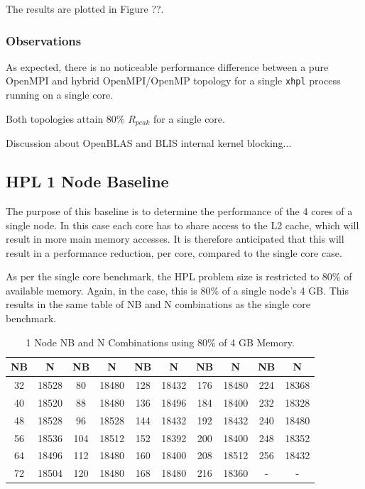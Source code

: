\documentclass{report}
\begin{document}
The results are plotted in Figure ??.


%
%
\subsubsection{Observations}

As expected, there is no noticeable performance difference between a pure OpenMPI and hybrid OpenMPI/OpenMP topology for a single \verb|xhpl| process running on a single core.

Both topologies attain 80\% $R_{peak}$ for a single core.

Discussion about OpenBLAS and BLIS internal kernel blocking...


%
%
\subsection{HPL 1 Node Baseline}

The purpose of this baseline is to determine the performance of the 4 cores of a single node. In this case each core has to share access to the L2 cache, which will result in more main memory accesses. It is therefore anticipated that this will result in a performance reduction, per core, compared to the single core case.

As per the single core benchmark, the HPL problem size is restricted to 80\% of available memory. Again, in the case, this is 80\% of a single node's 4 GB. This results in the same table of NB and N combinations as the single core benchmark.

\begin{table}[H]
\begin{center}
	\begin{tabular}{ |c|c|c|c|c|c|c|c|c|c| } 
		\hline
		NB & N & NB & N & NB & N & NB & N & NB & N \\ 
		\hline
		32 & 18528 &  80 & 18480 & 128 & 18432 & 176 & 18480 & 224 & 18368 \\ 
		40 & 18520 &  88 & 18480 & 136 & 18496 & 184 & 18400 & 232 & 18328 \\ 
 		48 & 18528 &  96 & 18528 & 144 & 18432 & 192 & 18432 & 240 & 18480 \\
		56 & 18536 & 104 & 18512 & 152 & 18392 & 200 & 18400 & 248 & 18352 \\ 
 		64 & 18496 & 112 & 18480 & 160 & 18400 & 208 & 18512 & 256 & 18432 \\
		72 & 18504 & 120 & 18480 & 168 & 18480 & 216 & 18360 &   - &     - \\ 
 		\hline
	\end{tabular}
\end{center}
\caption{\label{tab:table-name}1 Node NB and N Combinations using 80\% of 4 GB Memory.}
\end{table}
\end{document}
